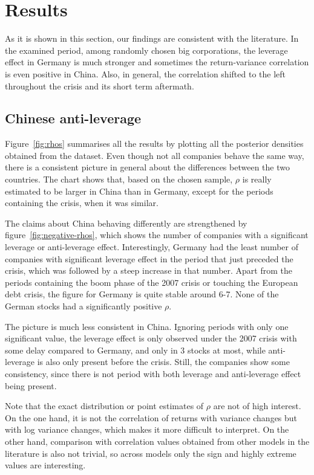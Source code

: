 \section{Results}

As it is shown in this section, our findings are consistent with the literature.
In the examined period, among randomly chosen big corporations, the leverage effect in Germany is much stronger and sometimes the return-variance correlation is even positive in China.
Also, in general, the correlation shifted to the left throughout the crisis and its short term aftermath.

\subsection{Chinese anti-leverage}

Figure~\ref{fig:rhos} summarises all the results by plotting all the posterior densities obtained from the dataset.
Even though not all companies behave the same way, there is a consistent picture in general about the differences between the two countries.
The chart shows that, based on the chosen sample, $\rho$ is really estimated to be larger in China than in Germany, except for the periods containing the crisis, when it was similar.

The claims about China behaving differently are strengthened by figure~\ref{fig:negative-rhos}, which shows the number of companies with a significant leverage or anti-leverage effect.
Interestingly, Germany had the least number of companies with significant leverage effect in the period that just preceded the crisis, which was followed by a steep increase in that number.
Apart from the periods containing the boom phase of the 2007 crisis or touching the European debt crisis, the figure for Germany is quite stable around 6-7.
None of the German stocks had a significantly positive $\rho$.

The picture is much less consistent in China.
Ignoring periods with only one significant value, the leverage effect is only observed under the 2007 crisis with some delay compared to Germany, and only in 3 stocks at most, while anti-leverage is also only present before the crisis.
Still, the companies show some consistency, since there is not period with both leverage and anti-leverage effect being present.

Note that the exact distribution or point estimates of $\rho$ are not of high interest.
On the one hand, it is not the correlation of returns with variance changes but with log variance changes, which makes it more difficult to interpret.
On the other hand, comparison with correlation values obtained from other models in the literature is also not trivial, so across models only the sign and highly extreme values are interesting.

